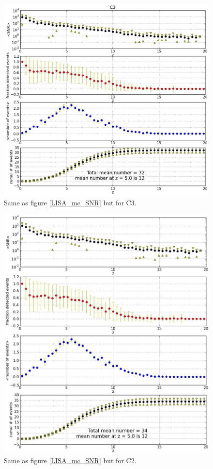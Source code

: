 \documentclass{iopart}
\begin{document}
\begin{figure}[H]
\center
   \includegraphics[width=1\textwidth]{FigSMBHPhenomAEI/C3_mc_SNRs.eps}
\caption{Same as figure \ref{LISA_mc_SNR} but for C3.
\label{C3_mc_SNR} } 
\end{figure}


\begin{figure}[H]
\center
   \includegraphics[width=1\textwidth]{FigSMBHPhenomAEI/C2_mc_SNRs.eps}
\caption{Same as figure \ref{LISA_mc_SNR} but for C2.
\label{C2_mc_SNR} } 
\end{figure}
\end{document}
